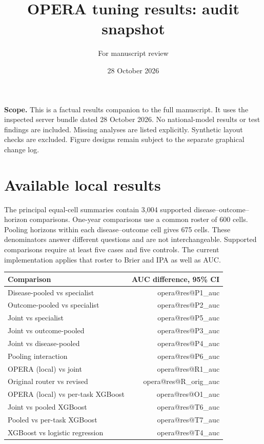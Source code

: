 \documentclass[11pt]{article}
\title{OPERA tuning results: audit snapshot}
\author{For manuscript review}
\date{28 October 2026}
\makeatletter
\newcommand{\result}[1]{\csname opera@res@#1\endcsname}
\makeatother
\begin{document}
\maketitle
\textbf{Scope.} This is a factual results companion to the full manuscript.
It uses the inspected server bundle dated 28 October 2026. No national-model
results or test findings are included. Missing analyses are listed explicitly.
Synthetic layout checks are excluded. Figure designs remain subject to the
separate graphical change log.

\section*{Available local results}
The principal equal-cell summaries contain 3,004 supported
disease--outcome--horizon comparisons. One-year comparisons use a common
roster of 600 cells. Pooling horizons within each disease--outcome cell gives
675 cells. These denominators answer different questions and are not
interchangeable. Supported comparisons require at least five cases and five
controls. The current implementation applies that roster to Brier and IPA
as well as AUC.

\begin{center}\small
\begin{tabular}{lr}\toprule
Comparison & AUC difference, 95\% CI\\\midrule
Disease-pooled vs specialist & \result{P1_auc}\\
Outcome-pooled vs specialist & \result{P2_auc}\\
Joint vs specialist & \result{P5_auc}\\
Joint vs outcome-pooled & \result{P3_auc}\\
Joint vs disease-pooled & \result{P4_auc}\\
Pooling interaction & \result{P6_auc}\\
OPERA (local) vs joint & \result{R1_auc}\\
Original router vs revised & \result{R_orig_auc}\\
OPERA (local) vs per-task XGBoost & \result{O1_auc}\\
Joint vs pooled XGBoost & \result{T6_auc}\\
Pooled vs per-task XGBoost & \result{T7_auc}\\
XGBoost vs logistic regression & \result{T4_auc}\\\bottomrule
\end{tabular}\end{center}
\end{document}
